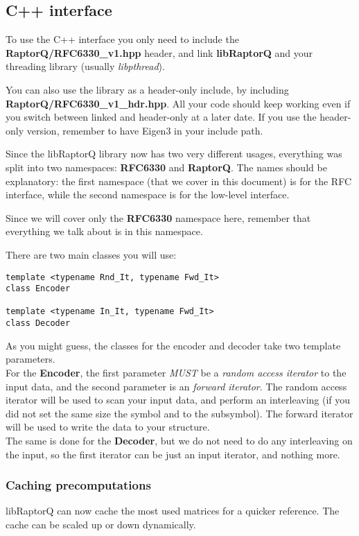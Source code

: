 \documentclass[11pt,a4paper]{refart}
\begin{document}
\subsection{C++ interface}
To use the C++ interface you only need to include the \textbf{RaptorQ/RFC6330\_v1.hpp} header, and link \textbf{libRaptorQ} and your threading library (usually
\textit{libpthread}).

You can also use the library as a header-only include, by including \textbf{RaptorQ/RFC6330\_v1\_hdr.hpp}. All your code should keep working even if you switch between linked and header-only at a later date. If you use the header-only version, remember to have Eigen3 in your include path.

Since the libRaptorQ library now has two very different usages, everything was split into two namespaces: \textbf{RFC6330} and \textbf{RaptorQ}. The names should be explanatory: the first namespace (that we cover in this document) is for the RFC interface, while the second namespace is for the low-level interface.

Since we will cover only the \textbf{RFC6330} namespace here, remember that everything we talk about is in this namespace.

\newpage

There are two main classes you will use:
\begin{verbatim}
template <typename Rnd_It, typename Fwd_It>
class Encoder

template <typename In_It, typename Fwd_It>
class Decoder
\end{verbatim}

As you might guess, the classes for the encoder and decoder take two template parameters.\\
For the \textbf{Encoder}, the first parameter \textit{MUST} be a \textit{random access iterator} to the input data, and the second parameter is an
\textit{forward iterator}. The random access iterator will be used to scan your input data, and perform an interleaving (if you did not set the same size the
symbol and to the subsymbol). The forward iterator will be used to write the data to your structure.\\
The same is done for the \textbf{Decoder}, but we do not need to do any interleaving on the input, so the first iterator can be just an input iterator,
and nothing more.

\subsubsection{Caching precomputations}
libRaptorQ can now cache the most used matrices for a quicker reference. The cache can be scaled up or down dynamically.
\end{document}
